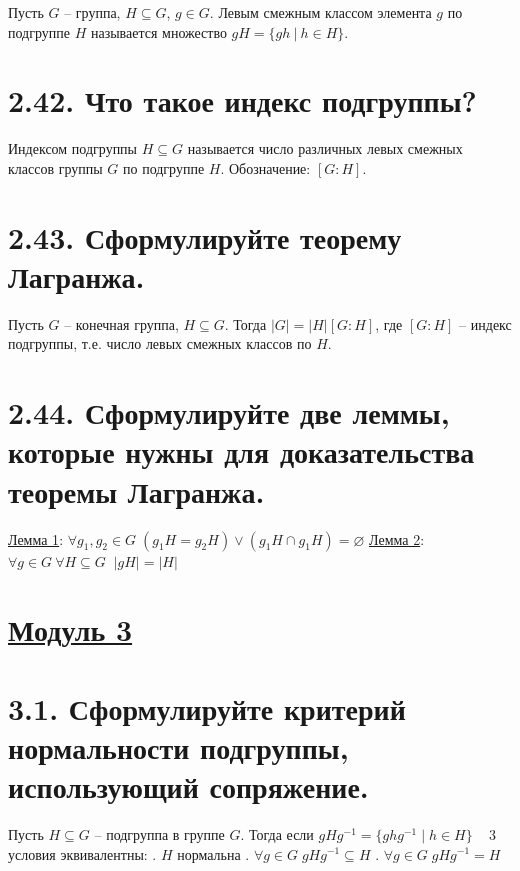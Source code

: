 \documentclass{article}
\begin{document}
Пусть $G$ -- группа, $H \subseteq G$, $g \in G$. Левым смежным классом элемента $g$ по подгруппе $H$ называется множество $gH = \{gh \:|\: h \in H\}$.

\section*{\LARGE 2.42. Что такое индекс подгруппы? }

Индексом подгруппы $H \subseteq G$ называется число различных левых смежных классов группы $G$ по подгруппе $H$. Обозначение: $[G : H]$.

\section*{\LARGE 2.43. Сформулируйте теорему Лагранжа. }

Пусть $G$ -- конечная группа, $H \subseteq G$. Тогда $|G| = |H|[G : H]$, где $[G : H]$ -- индекс подгруппы, т.е. число левых смежных классов по $H$.

\section*{\LARGE 2.44. Сформулируйте две леммы, которые нужны для доказательства теоремы Лагранжа. }

\underline{Лемма 1}:
\newline $\forall g_1, g_2 \in G \; (g_1H = g_2H) \vee (g_1H \cap g_1H) = \varnothing$
\newline \underline{Лемма 2}:
\newline $\forall g \in G \: \forall H \subseteq G \;\; |gH| = |H|$

\newpage
{}
\section*{\LARGE\centering \underline{Модуль 3}}

\section*{\LARGE 3.1. Сформулируйте критерий нормальности подгруппы, использующий сопряжение.}
Пусть $H \subseteq G$ -- подгруппа в группе $G$. Тогда если $gHg^{-1} = \{ghg^{-1}\;|\;h\in H\}\;\;\;$ 3 условия эквивалентны:
\newline {}. $H$ нормальна
\newline {}. $\forall g \in G \; gHg^{-1} \subseteq H $
\newline {}. $\forall g \in G \; gHg^{-1} = H $
\end{document}
